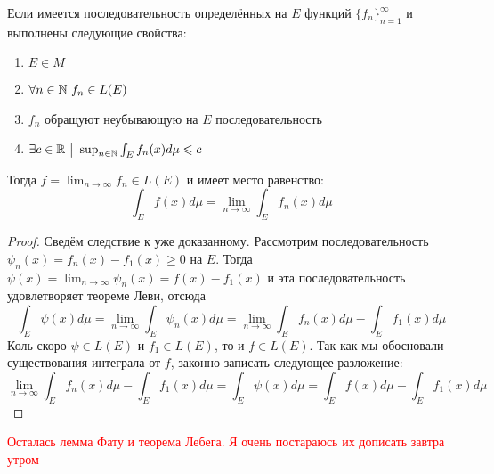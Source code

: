 \begin{corollary}
	Если имеется последовательность определённых на $E$ функций $\{f_n\}_{n = 1}^\infty$ и выполнены следующие свойства:
	\begin{enumerate}
		\item $E \in M$
		
		\item $\forall n \in \mathbb{N}\ f_n \in L(E)$
		
		\item $f_n$ обращуют неубывающую на $E$ последовательность
		
		\item $\exists c \in \mathbb{R} \ \big|\  \sup_{n \in \mathbb{N}} \int_E f_n(x)d\mu \leqslant c$
	\end{enumerate}
	Тогда $f = \lim_{n \to \infty} f_n \in L(E)$ и имеет место равенство:
	\[
		\int_E f(x)d\mu = \lim_{n \to \infty} \int_E f_n(x)d\mu
	\]
\end{corollary}

\begin{proof}
	Сведём следствие к уже доказанному. Рассмотрим последовательность $\psi_n(x) = f_n(x) - f_1(x) \ge 0$ на $E$. Тогда $\psi(x) = \lim_{n \to \infty} \psi_n(x) = f(x) - f_1(x)$ и эта последовательность удовлетворяет теореме Леви, отсюда
	\[
		\int_E \psi(x)d\mu = \lim_{n \to \infty} \int_E \psi_n(x)d\mu = \lim_{n \to \infty} \int_E f_n(x)d\mu - \int_E f_1(x)d\mu
	\]
	Коль скоро $\psi \in L(E)$ и $f_1 \in L(E)$, то и $f \in L(E)$. Так как мы обосновали существования интеграла от $f$, законно записать следующее разложение:
	\[
		\lim_{n \to \infty} \int_E f_n(x)d\mu - \int_E f_1(x)d\mu = \int_E \psi(x)d\mu = \int_E f(x)d\mu - \int_E f_1(x)d\mu
	\]
\end{proof}

\textcolor{red}{Осталась лемма Фату и теорема Лебега. Я очень постараюсь их дописать завтра утром}